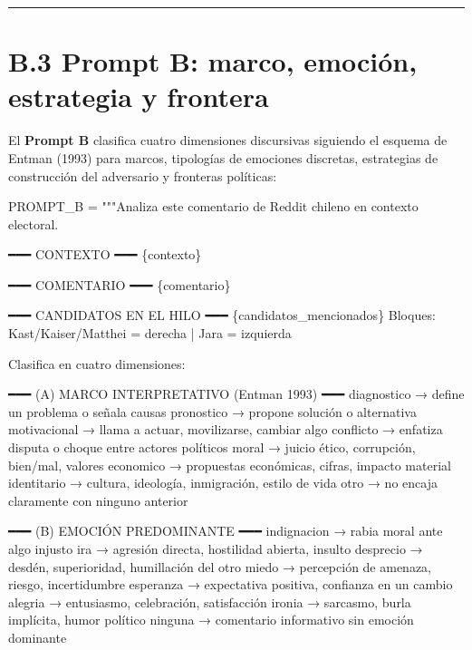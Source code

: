 \documentclass[
  letterpaper,
  numbers=noendperiod,
  fontsize=11pt,
  DIV=12,
  titlepage=false]{scrreprt}
\newenvironment{Shaded}{\begin{snugshade}}{\end{snugshade}}
\newcommand{\NormalTok}[1]{\textcolor[rgb]{0.00,0.23,0.31}{#1}}
\newcommand{\OperatorTok}[1]{\textcolor[rgb]{0.37,0.37,0.37}{#1}}
\newcommand{\SpecialCharTok}[1]{\textcolor[rgb]{0.37,0.37,0.37}{#1}}
\newcommand{\StringTok}[1]{\textcolor[rgb]{0.13,0.47,0.30}{#1}}
\begin{document}
\begin{center}\rule{0.5\linewidth}{0.5pt}\end{center}

\section{B.3 Prompt B: marco, emoción, estrategia y
frontera}\label{b.3-prompt-b-marco-emociuxf3n-estrategia-y-frontera}

El \textbf{Prompt B} clasifica cuatro dimensiones discursivas siguiendo
el esquema de Entman (1993) para marcos, tipologías de emociones
discretas, estrategias de construcción del adversario y fronteras
políticas:

\begin{Shaded}
\begin{Highlighting}[]
\NormalTok{PROMPT\_B }\OperatorTok{=} \StringTok{"""Analiza este comentario de Reddit chileno en contexto electoral.}

\StringTok{━━━ CONTEXTO ━━━}
\SpecialCharTok{\{contexto\}}

\StringTok{━━━ COMENTARIO ━━━}
\SpecialCharTok{\{comentario\}}

\StringTok{━━━ CANDIDATOS EN EL HILO ━━━}
\SpecialCharTok{\{candidatos\_mencionados\}}
\StringTok{Bloques: Kast/Kaiser/Matthei = derecha | Jara = izquierda}

\StringTok{Clasifica en cuatro dimensiones:}

\StringTok{━━━ (A) MARCO INTERPRETATIVO (Entman 1993) ━━━}
\StringTok{diagnostico   → define un problema o señala causas}
\StringTok{pronostico    → propone solución o alternativa}
\StringTok{motivacional  → llama a actuar, movilizarse, cambiar algo}
\StringTok{conflicto     → enfatiza disputa o choque entre actores políticos}
\StringTok{moral         → juicio ético, corrupción, bien/mal, valores}
\StringTok{economico     → propuestas económicas, cifras, impacto material}
\StringTok{identitario   → cultura, ideología, inmigración, estilo de vida}
\StringTok{otro          → no encaja claramente con ninguno anterior}

\StringTok{━━━ (B) EMOCIÓN PREDOMINANTE ━━━}
\StringTok{indignacion  → rabia moral ante algo injusto}
\StringTok{ira          → agresión directa, hostilidad abierta, insulto}
\StringTok{desprecio    → desdén, superioridad, humillación del otro}
\StringTok{miedo        → percepción de amenaza, riesgo, incertidumbre}
\StringTok{esperanza    → expectativa positiva, confianza en un cambio}
\StringTok{alegria      → entusiasmo, celebración, satisfacción}
\StringTok{ironia       → sarcasmo, burla implícita, humor político}
\StringTok{ninguna      → comentario informativo sin emoción dominante}


\end{Highlighting}
\end{Shaded}
\end{document}
